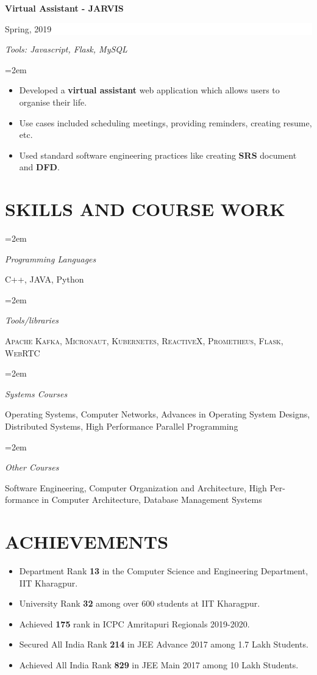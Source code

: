 \documentclass[paper=a4,fontsize=10pt]{scrartcl} %
\newlength{\spacebox}
\newcommand{\sepspace}{\vspace*{1em}}		%
\newcommand{\NewPart}[1]{\section*{\uppercase{#1}}}
\newcommand{\PersonalEntry}[2]{
		\noindent\hangindent=1em\hangafter=0 %
		\parbox{\spacebox}{        %
		\textit{#1}}		       %
		\hspace{1.5em} #2 \par}    %
\newcommand{\SkillsEntry}[2]{      %
		\noindent\hangindent=2em\hangafter=0 %
		\parbox{\spacebox}{        %
		\textit{#1}}			   %
		\hspace{1.5em} #2 \par}    %
\newcommand{\EducationEntry}[4]{
		\noindent \textbf{#1} \hfill      %
		\colorbox{White}{%
			\parbox{6em}{%
			\hfill\color{Black}#2}} \par  %
		\noindent \textit{#3} \par        %
		\noindent\hangindent=2em\hangafter=0 \small #4 %
		\normalsize \par}
\begin{document}
\EducationEntry{Virtual Assistant - JARVIS}{Spring, 2019}{Tools: Javascript, Flask, MySQL}{
\begin{itemize}[noitemsep]
  \item Developed a \textbf{virtual assistant} web application which allows users to organise their life.
  \item Use cases included scheduling meetings, providing reminders, creating resume, etc.
  \item Used standard software engineering practices like creating \textbf{SRS} document and \textbf{DFD}.
\end{itemize}
}
\sepspace



\NewPart{Skills And Course Work}{
\SkillsEntry{Programming Languages}{C++, JAVA, Python}
\sepspace
\SkillsEntry{Tools/libraries}{\textsc{Apache Kafka}, \textsc{Micronaut}, \textsc{Kubernetes}, \textsc{ReactiveX}, \textsc{Prometheus},     \hspace*{24mm} \textsc{Flask}, \textsc{WebRTC}}
\sepspace
\SkillsEntry{Systems Courses}{Operating Systems, Computer Networks, Advances in Operating System \hspace*{24mm} Designs, Distributed Systems, High Performance Parallel Programming}
\sepspace
\SkillsEntry{Other Courses}{Software Engineering, Computer Organization and Architecture, High Per- \hspace*{24mm} formance in Computer Architecture, Database Management Systems}
}


\NewPart{Achievements}{
\begin{itemize}[noitemsep]
  \item Department Rank \textbf{13} in the Computer Science and Engineering Department, IIT Kharagpur.
  \item University Rank \textbf{32} among over 600 students at IIT Kharagpur.
  \item Achieved \textbf{175} rank in ICPC Amritapuri Regionals 2019-2020.
  \item Secured All India Rank \textbf{214} in JEE Advance 2017 among 1.7 Lakh Students. \item Achieved All India Rank \textbf{829} in JEE Main 2017 among 10 Lakh Students.
\end{itemize}
}
\end{document}
